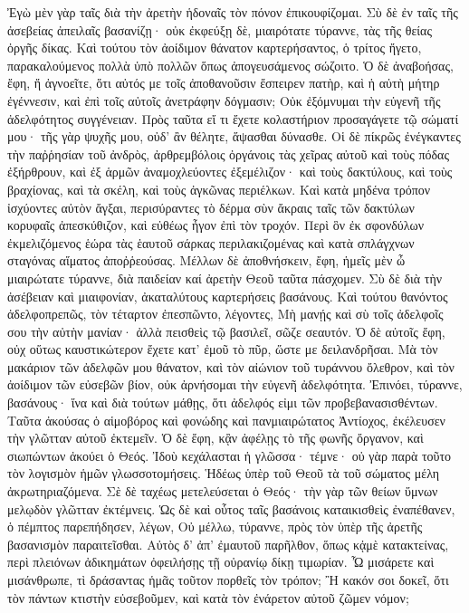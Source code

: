 Ἐγὼ μὲν γὰρ ταῖς διὰ τὴν ἀρετὴν ἡδοναῖς τὸν πόνον ἐπικουφίζομαι. 
Σὺ δὲ ἐν ταῖς τῆς ἀσεβείας ἀπειλαῖς βασανίζῃ· οὐκ ἐκφεύξῃ δὲ, μιαιρότατε τύραννε, τὰς τῆς θείας ὀργῆς δίκας. 
Καὶ τούτου τὸν ἀοίδιμον θάνατον καρτερήσαντος, ὁ τρίτος ἤγετο, παρακαλούμενος πολλὰ ὑπὸ πολλῶν ὅπως ἀπογευσάμενος σώζοιτο. 
Ὁ δὲ ἀναβοήσας, ἔφη, ἤ ἀγνοεῖτε, ὅτι αὐτός με τοῖς ἀποθανοῦσιν ἔσπειρεν πατὴρ, καὶ ἡ αὐτὴ μήτηρ ἐγέννεσιν, καὶ ἐπὶ τοῖς αὐτοῖς ἀνετράφην δόγμασιν; 
Οὐκ ἐξόμνυμαι τὴν εὐγενῆ τῆς ἀδελφότητος συγγένειαν. 
Πρὸς ταῦτα εἴ τι ἔχετε κολαστήριον προσαγάγετε τῷ σώματί μου· τῆς γὰρ ψυχῆς μου, οὐδ' ἂν θέλητε, ἅψασθαι δύνασθε. 
Οἱ δὲ πίκρῶς ἐνέγκαντες τὴν παῤῥησίαν τοῦ ἀνδρὸς, ἀρθρεμβόλοις ὀργάνοις τὰς χεῖρας αὐτοῦ καὶ τοὺς πόδας ἐξήρθρουν, καὶ ἐξ ἁρμῶν ἀναμοχλεύοντες ἐξεμέλιζον· 
καὶ τοὺς δακτύλους, καὶ τοὺς βραχίονας, καὶ τὰ σκέλη, καὶ τοὺς ἀγκῶνας περιέλκων. 
Καὶ κατὰ μηδένα τρόπον ἰσχύοντες αὐτὸν ἄγξαι, περισύραντες τὸ δέρμα σὺν ἄκραις ταῖς τῶν δακτύλων κορυφαῖς ἀπεσκύθιζον, καὶ εὐθέως ἦγον ἐπὶ τὸν τροχόν. 
Περὶ ὃν ἐκ σφονδύλων ἐκμελιζόμενος ἑώρα τὰς ἑαυτοῦ σάρκας περιλακιζομένας καὶ κατὰ σπλάγχνων σταγόνας αἵματος ἀποῤῥεούσας. 
Μέλλων δὲ ἀποθνήσκειν, 
ἔφη, ἡμεῖς μὲν ὦ μιαιρώτατε τύραννε, διὰ παιδείαν καί ἀρετὴν Θεοῦ ταῦτα πάσχομεν. 
Σὺ δὲ διὰ τὴν ἀσέβειαν καὶ μιαιφονίαν, ἀκαταλύτους καρτερήσεις βασάνους. 
Καὶ τούτου θανόντος ἀδελφοπρεπῶς, τὸν τέταρτον ἐπεσπῶντο, λέγοντες, 
Μὴ μανῄς καὶ σὺ τοῖς ἀδελφοῖς σου τὴν αὐτὴν μανίαν· ἀλλὰ πεισθεὶς τῷ βασιλεῖ, σῶζε σεαυτόν. 
Ὁ δὲ αὐτοῖς ἔφη, οὐχ οὕτως καυστικώτερον ἔχετε κατ' ἐμοῦ τὸ πῦρ, ὥστε με δειλανδρῆσαι. 
Μὰ τὸν μακάριον τῶν ἀδελφῶν μου θάνατον, καὶ τὸν αἰώνιον τοῦ τυράννου ὄλεθρον, καὶ τὸν ἀοίδιμον τῶν εὐσεβῶν βίον, οὐκ ἀρνήσομαι τὴν εὐγενῆ ἀδελφότητα. 
Ἐπινόει, τύραννε, βασάνους· ἵνα καὶ διὰ τούτων μάθῃς, ὅτι ἀδελφός εἰμι τῶν προβεβανασισθέντων. 
Ταῦτα ἀκούσας ὁ αἱμοβόρος καὶ φονώδης καὶ πανμιαιρώτατος Ἀντίοχος, ἐκέλευσεν τὴν γλῶτταν αὐτοῦ ἐκτεμεῖν. 
Ὁ δὲ ἔφη, κᾂν ἀφέλῃς τὸ τῆς φωνῆς ὄργανον, καὶ σιωπώντων ἀκούει ὁ Θεός. 
Ἰδοὺ κεχάλασται ἡ γλῶσσα· τέμνε· οὐ γὰρ παρὰ τοῦτο τὸν λογισμὸν ἡμῶν γλωσσοτομήσεις. 
Ἡδέως ὑπὲρ τοῦ Θεοῦ τὰ τοῦ σώματος μέλη ἀκρωτηριαζόμενα. 
Σὲ δὲ ταχέως μετελεύσεται ὁ Θεός· τὴν γὰρ τῶν θείων ὕμνων μελῳδὸν γλῶτταν ἐκτέμνεις. 
Ὡς δὲ καὶ οὗτος ταῖς βασάνοις καταικισθεὶς ἐναπέθανεν, ὁ πέμπτος παρεπήδησεν, λέγων, 
Οὐ μέλλω, τύραννε, πρὸς τὸν ὑπὲρ τῆς ἀρετῆς βασανισμὸν παραιτεῖσθαι. 
Αὐτὸς δ' ἀπ' ἐμαυτοῦ παρῆλθον, ὅπως κᾀμὲ κατακτείνας, περὶ πλειόνων ἀδικημάτων ὀφειλήσῃς τῇ οὐρανίῳ δίκῃ τιμωρίαν. 
Ὦ μισάρετε καὶ μισάνθρωπε, τὶ δράσαντας ἡμᾶς τοῦτον πορθεῖς τὸν τρόπον; 
Ἢ κακόν σοι δοκεῖ, ὅτι τὸν πάντων κτιστὴν εὐσεβοῦμεν, καὶ κατὰ τὸν ἐνάρετον αὐτοῦ ζῶμεν νόμον; 
